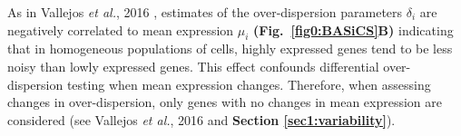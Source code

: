 As in Vallejos \emph{et al.}, 2016 \citep{Vallejos2016}, estimates of the over-dispersion parameters $\delta_i$ are negatively correlated to mean expression $\mu_i$ \textbf{(Fig.~\ref{fig0:BASiCS}B)} indicating that in homogeneous populations of cells, highly expressed genes tend to be less noisy than lowly expressed genes. This effect confounds differential over-dispersion testing when mean expression changes. Therefore, when assessing changes in over-dispersion, only genes with no changes in mean expression are considered (see Vallejos \emph{et al.}, 2016 \citep{Vallejos2016} and \textbf{Section \ref{sec1:variability}}).  
